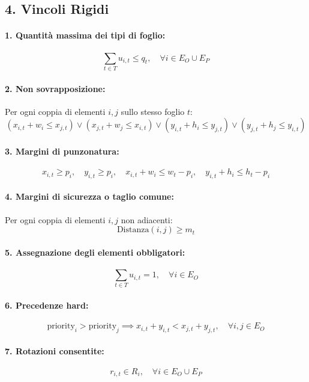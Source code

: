 \subsection*{4. Vincoli Rigidi}

\paragraph*{1. Quantità massima dei tipi di foglio:}
\[
\sum_{t \in T} u_{i,t} \leq q_t, \quad \forall i \in E_O \cup E_P
\]

\paragraph*{2. Non sovrapposizione:}
Per ogni coppia di elementi \( i, j \) sullo stesso foglio \( t \):
\[
(x_{i,t} + w_i \leq x_{j,t}) \lor (x_{j,t} + w_j \leq x_{i,t}) \lor (y_{i,t} + h_i \leq y_{j,t}) \lor (y_{j,t} + h_j \leq y_{i,t})
\]

\paragraph*{3. Margini di punzonatura:}
\[
x_{i,t} \geq p_i, \quad y_{i,t} \geq p_i, \quad x_{i,t} + w_i \leq w_t - p_i, \quad y_{i,t} + h_i \leq h_t - p_i
\]

\paragraph*{4. Margini di sicurezza o taglio comune:}
Per ogni coppia di elementi \( i, j \) non adiacenti:
\[
\text{Distanza}(i,j) \geq m_t
\]

\paragraph*{5. Assegnazione degli elementi obbligatori:}
\[
\sum_{t \in T} u_{i,t} = 1, \quad \forall i \in E_O
\]

\paragraph*{6. Precedenze hard:}
\[
\text{priority}_i > \text{priority}_j \implies x_{i,t} + y_{i,t} < x_{j,t} + y_{j,t}, \quad \forall i,j \in E_O
\]

\paragraph*{7. Rotazioni consentite:}
\[
r_{i,t} \in R_i, \quad \forall i \in E_O \cup E_P
\]

